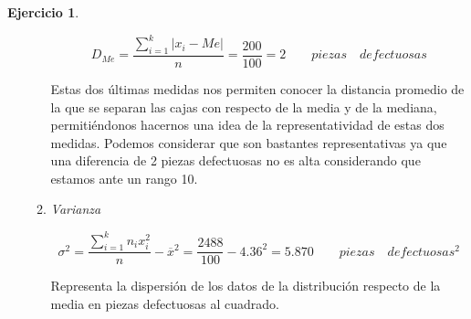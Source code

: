 \documentclass[a4paper, 12pt]{article}
\providecommand{\abs}[1]{\lvert#1\rvert}
\theoremstyle{definition}
\newtheorem{ej}{Ejercicio}
\begin{document}
\begin{ej}
\begin{enumerate}[label=\textit{\alph*)}]
\begin{enumerate}[label=\arabic*)]
        \begin{center}
            \end{center}
        
        \[
        D_{Me} = \frac{\sum_{i=1}^{k}\abs{x_i-Me}}{n} = \frac{200}{100} = 2\qquad piezas\quad defectuosas
        \]
        
        Estas dos últimas medidas nos permiten conocer la distancia promedio de la que se separan las cajas con respecto de la media y de la mediana, permitiéndonos hacernos una idea de la representatividad de estas dos medidas. Podemos considerar que son bastantes representativas ya que una diferencia de 2 piezas defectuosas no es alta considerando que estamos ante un rango 10.
        
        \item \textit{Varianza}
        
        \begin{center}
            \end{center}
        
        \[
        \sigma^2 = \frac{\sum_{i=1}^{k}n_ix_i^2}{n} - \overline{x}^2 = \frac{2488}{100} - 4.36^2 = 5.870\qquad piezas\quad defectuosas^2
        \]
        
        Representa la dispersión de los datos de la distribución respecto de la media en piezas defectuosas al cuadrado.
        

\end{enumerate}
\end{enumerate}
\end{ej}
\end{document}
